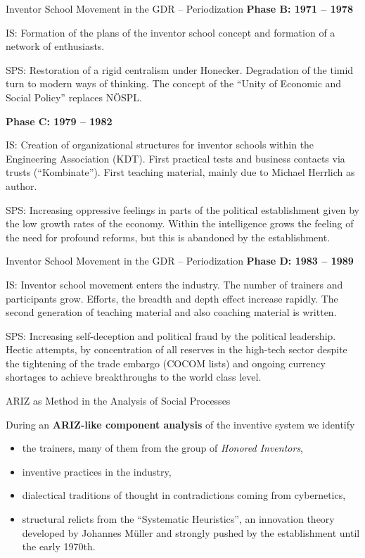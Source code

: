 \documentclass[11pt]{beamer}
\begin{document}
\begin{frame}{Inventor School Movement in the GDR -- Periodization}
\small
  \textbf{Phase B: 1971 -- 1978}

  IS: Formation of the plans of the inventor school concept and formation of a
  network of enthusiasts.

  SPS: Restoration of a rigid centralism under Honecker. Degradation of the
  timid turn to modern ways of thinking. The concept of the ``Unity of
  Economic and Social Policy'' replaces NÖSPL.
  
  \textbf{Phase C: 1979 -- 1982}

  IS: Creation of organizational structures for inventor schools within the
  Engineering Association (KDT). First practical tests and business contacts
  via trusts (``Kombinate''). First teaching material, mainly due to
  Michael Herrlich as author.

  SPS: Increasing oppressive feelings in parts of the political establishment
  given by the low growth rates of the economy. Within the intelligence grows
  the feeling of the need for profound reforms, but this is abandoned by the
  establishment.

\end{frame}

\begin{frame}{Inventor School Movement in the GDR -- Periodization}
\small
  \textbf{Phase D: 1983 -- 1989}

  IS: Inventor school movement enters the industry. The number of trainers and
  participants grow. Efforts, the breadth and depth effect increase rapidly.
  The second generation of teaching material and also coaching material is
  written.

  SPS: Increasing self-deception and political fraud by the political
  leadership.  Hectic attempts, by concentration of all reserves in the
  high-tech sector despite the tightening of the trade embargo (COCOM lists)
  and ongoing currency shortages to achieve breakthroughs to the world class
  level.

\end{frame}

\begin{frame}{ARIZ as Method in the Analysis of Social Processes}

  During an \textbf{ARIZ-like component analysis} of the inventive system we
  identify
  \begin{itemize}
  \item the trainers, many of them from the group of \emph{Honored Inventors},
  \item inventive practices in the industry,
  \item dialectical traditions of thought in contradictions coming from
    cybernetics,
  \item structural relicts from the ``Systematic Heuristics'', an innovation
    theory developed by Johannes Müller and strongly pushed by the
    establishment until the early 1970th.
  \end{itemize}
\end{frame}
\end{document}
